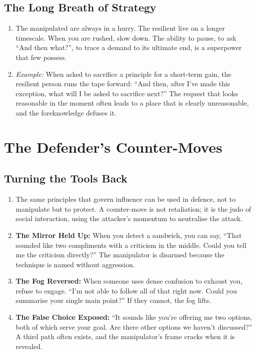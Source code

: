 \documentclass[12pt,a4paper,oneside]{book}
\begin{document}
\section{The Long Breath of Strategy}
\begin{enumerate}[leftmargin=*, label=\arabic*.]
\item The manipulated are always in a hurry. The resilient live on a longer timescale. When you are rushed, slow down. The ability to pause, to ask “And then what?”, to trace a demand to its ultimate end, is a superpower that few possess.
\item \textit{Example:} When asked to sacrifice a principle for a short-term gain, the resilient person runs the tape forward: “And then, after I've made this exception, what will I be asked to sacrifice next?” The request that looks reasonable in the moment often leads to a place that is clearly unreasonable, and the foreknowledge defuses it.
\end{enumerate}

\chapter{The Defender's Counter-Moves}
\section{Turning the Tools Back}
\begin{enumerate}[leftmargin=*, label=\arabic*.]
\item The same principles that govern influence can be used in defence, not to manipulate but to protect. A counter-move is not retaliation; it is the judo of social interaction, using the attacker's momentum to neutralise the attack.
\item \textbf{The Mirror Held Up:} When you detect a sandwich, you can say, “That sounded like two compliments with a criticism in the middle. Could you tell me the criticism directly?” The manipulator is disarmed because the technique is named without aggression.
\item \textbf{The Fog Reversed:} When someone uses dense confusion to exhaust you, refuse to engage. “I'm not able to follow all of that right now. Could you summarise your single main point?” If they cannot, the fog lifts.
\item \textbf{The False Choice Exposed:} “It sounds like you're offering me two options, both of which serve your goal. Are there other options we haven't discussed?” A third path often exists, and the manipulator's frame cracks when it is revealed.
\end{enumerate}
\end{document}
